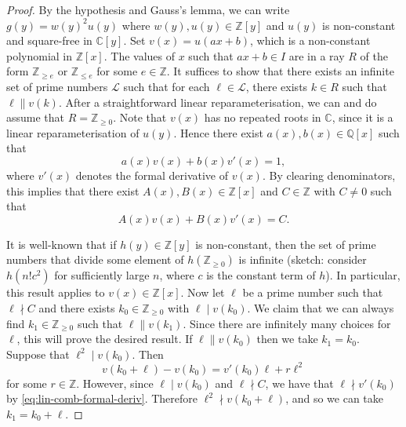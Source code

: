 \documentclass[10pt,a4paper]{amsart}
\newcommand{\C}{\mathbb{C}}
\newcommand{\Q}{\mathbb{Q}}
\newcommand{\Z}{\mathbb{Z}}
\begin{document}
\begin{proof}
By the hypothesis and Gauss's lemma, we can write $g(y)=w(y)^{2}u(y)$ where $w(y),u(y) \in \Z[y]$ and
$u(y)$ is non-constant and square-free in $\C[y]$.
Set $v(x)=u(ax+b)$, which is a non-constant polynomial in $\Z[x]$. 
The values of $x$ such that $ax+b\in I$ are in a ray $R$ of the form $\Z_{\geq e}$ or $\Z_{\leq e}$ for some
$e \in \Z$.
It suffices to show that there exists an infinite set of prime numbers $\mathcal{L}$ such that for each
$\ell \in \mathcal{L}$, there exists $k \in R$ such that $\ell \parallel v(k)$.
After a straightforward linear reparameterisation, we can and do assume that $R=\Z_{\geq 0}$. 
Note that $v(x)$ has no repeated roots in $\C$, since it is a linear reparameterisation of $u(y)$.
Hence there exist $a(x),b(x)\in \Q[x]$ such that
\[
 a(x)v(x)+b(x)v'(x)=1,
\]
where $v'(x)$ denotes the formal derivative of $v(x)$. 
By clearing denominators, this implies that there exist $A(x),B(x) \in \Z[x]$ and $C \in \Z$ with $C \neq 0$
such that 
\begin{equation}\label{eq:lin-comb-formal-deriv}
A(x)v(x)+B(x)v'(x)=C. 
\end{equation}

It is well-known that if $h(y) \in \Z[y]$ is non-constant, 
then the set of prime numbers that divide some element of $h(\Z_{\geq 0})$ is infinite 
(sketch: consider $h(n!c^2)$ for sufficiently large $n$, where $c$ is the constant term of $h$).
In particular, this result applies to $v(x) \in \Z[x]$.
Now let $\ell$ be a prime number such that $\ell \nmid C$ and there exists $k_{0} \in \Z_{\geq 0}$ with 
$\ell\mid v(k_{0})$. 
We claim that we can always find $k_{1} \in \Z_{\geq 0}$ such that $\ell \parallel v(k_{1})$. 
Since there are infinitely many choices for $\ell$, this will prove the desired result.
If $\ell \parallel v(k_{0})$ then we take $k_{1}=k_{0}$.
Suppose that $\ell^{2} \mid v(k_{0})$. Then
\[
 v(k_{0}+\ell)-v(k_{0})=v'(k_{0})\ell+r\ell^{2}
\]
for some $r \in \Z$.
However, since $\ell\mid v(k_{0})$ and $\ell\nmid C$, we have that $\ell\nmid v'(k_{0})$ by 
\eqref{eq:lin-comb-formal-deriv}. 
Therefore $\ell^{2} \nmid v(k_{0}+\ell)$, and so we can take $k_{1}=k_{0}+\ell$.
\end{proof}
\end{document}
